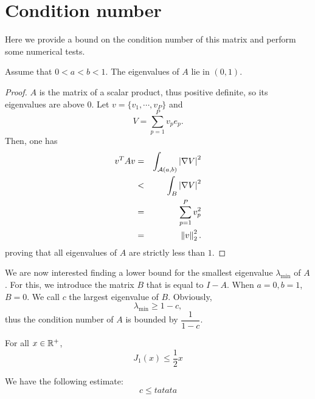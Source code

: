 \documentclass[11pt,a4paper]{article}
\begin{document}
\section{Condition number}
Here we provide a bound on the condition number of this matrix and perform some numerical tests. 
\begin{Prop}
	Assume that $0 < a < b < 1$. The eigenvalues of $A$ lie in $(0,1)$. 
	\begin{proof}
		$A$ is the matrix of a scalar product, thus positive definite, so its eigenvalues are above $0$. Let $v = \{v_1,\cdots,v_P\}$ and 
		\[V = \sum_{p=1}^P v_p e_p.\]
		Then, one has
		\begin{eqnarray*}
			v^T Av &=& \int_{\mathcal{A}(a,b)}\left\lvert \nabla V \right\rvert^2\\
			& < &\int_{B}\left\lvert \nabla V \right\rvert^2\\
			& = & \sum_{p = 1}^P{v_p^2}\\
			& = & \left\|v\right\|^2_2.
		\end{eqnarray*}
		proving that all eigenvalues of $A$ are strictly less than $1$. \qedhere
	\end{proof}	
\end{Prop}
We are now interested finding a lower bound for the smallest eigenvalue $\lambda_{\min}$ of $A$. For this, we introduce the matrix $B$ that is equal to $I - A$. When $a=0, b=1$, $B = 0$. We call $c$ the largest eigenvalue of $B$. Obviously, 
\[ \lambda_{\min} \geq 1 - c,\]
thus the condition number of $A$ is bounded by $\dfrac{1}{1-c}$. 
\begin{Prop}
	For all $x \in \mathbb{R}^+$, 
	\[J_1(x) \leq \frac{1}{2}x\]
\end{Prop}
\begin{Prop}
	We have the following estimate: 
	\[c \leq tatata\]
\end{Prop}
\end{document}
